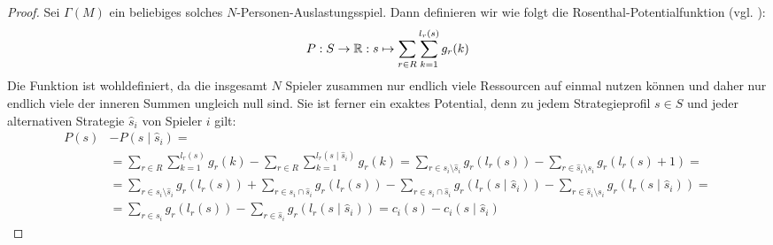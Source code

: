 \begin{proof}
	Sei $\Gamma(M)$ ein beliebiges solches $N$-Personen-Auslastungsspiel. Dann definieren wir wie folgt die Rosenthal-Potentialfunktion (vgl. \cite{RosenthalPotential}):
		\[P: S \to \mathbb{R}: s \mapsto \sum_{r \in R}\sum_{k=1}^{l_r(s)} g_r(k) \]
	Die Funktion ist wohldefiniert, da die insgesamt $N$ Spieler zusammen nur endlich viele Ressourcen auf einmal nutzen können und daher nur endlich viele der inneren Summen ungleich null sind. Sie ist ferner ein exaktes Potential, denn zu jedem Strategieprofil $s \in S$ und jeder alternativen Strategie $\hat{s}_i$ von Spieler $i$ gilt:
	\begin{align*}
		P(s) 	&- P(s\mid \hat{s}_i) =\\
				&= \sum_{r \in R}\sum_{k=1}^{l_r(s)} g_r(k) - \sum_{r \in R}\sum_{k=1}^{l_r(s\mid \hat{s}_i)} g_r(k) = \sum_{r \in s_i \setminus \hat{s}_i} g_r(l_r(s)) - \sum_{r \in \hat{s}_i \setminus s_i} g_r(l_r(s)+1) = \\
				&= \sum_{r \in s_i \setminus \hat{s}_i} g_r(l_r(s)) + \sum_{r \in s_i \cap \hat{s}_i} g_r(l_r(s)) - \sum_{r \in s_i \cap \hat{s}_i} g_r(l_r(s \mid \hat{s}_i)) - \sum_{r \in \hat{s}_i \setminus s_i} g_r(l_r(s\mid \hat{s}_i)) = \\
				&= \sum_{r \in s_i} g_r(l_r(s)) - \sum_{r \in \hat{s}_i} g_r(l_r(s\mid \hat{s}_i)) = c_i(s) - c_i(s \mid \hat{s}_i)
	\end{align*}
	

\end{proof}
